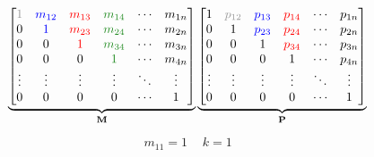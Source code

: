 
\begin{figure*}[tbp]
	\centering
	\begin{minipage}{\textwidth}
		 \[
 \underbrace{\left[
\begin{matrix}
 \textcolor{gray}{1}  &\textcolor{blue}{m_{12}}  &\textcolor{red}{m_{13}}   &\textcolor{ForestGreen}{m_{14}}      & \cdots    & m_{1n} \\
 0                    &\textcolor{blue}{1}   	 &\textcolor{red}{m_{23}}   &\textcolor{ForestGreen}{m_{24}}      & \cdots    & m_{2n} \\
 0                    &0             			 &\textcolor{red}{1}   	    &\textcolor{ForestGreen}{m_{34}}      & \cdots    & m_{3n} \\
 0                    &0             			 &0             			&\textcolor{ForestGreen}{1}   		& \cdots    & m_{4n} \\
 \vdots    		      &\vdots            		 & \vdots       			&\vdots       				    & \ddots    & \vdots \\
 0         		      &0             			 &0                         &0             				    & \cdots    & 1      \\
\end{matrix}   
\right]}_{\textbf{M}} 
 \underbrace{\left[
\begin{matrix}
 1         &\textcolor{gray}{p_{12}}       &\textcolor{blue}{p_{13}}       &\textcolor{red}{p_{14}}        & \cdots    & p_{1n} \\
 0         &1             	    		   &\textcolor{blue}{p_{23}}       &\textcolor{red}{p_{24}}        & \cdots    & p_{2n} \\
 0         &0             				   &1					   		   &\textcolor{red}{p_{34}}         & \cdots    & p_{3n} \\
 0         &0             				   &0             				   &1					  		    & \cdots    & p_{4n} \\
 \vdots    &\vdots            			   & \vdots       				   & \vdots       				    & \ddots    & \vdots \\
 0         &0             				   &0                              &0             					& \cdots    & 1      \\
\end{matrix}   
\right]}_{\textbf{P}}
\]
\[
\begin{alignedat}{3}
&\begin{array}{rl}&m_{11} = 1 \end{array} &k =1\ \ \ \ \ &\\ 

\end{alignedat}\]
\end{minipage}
\end{figure*}
